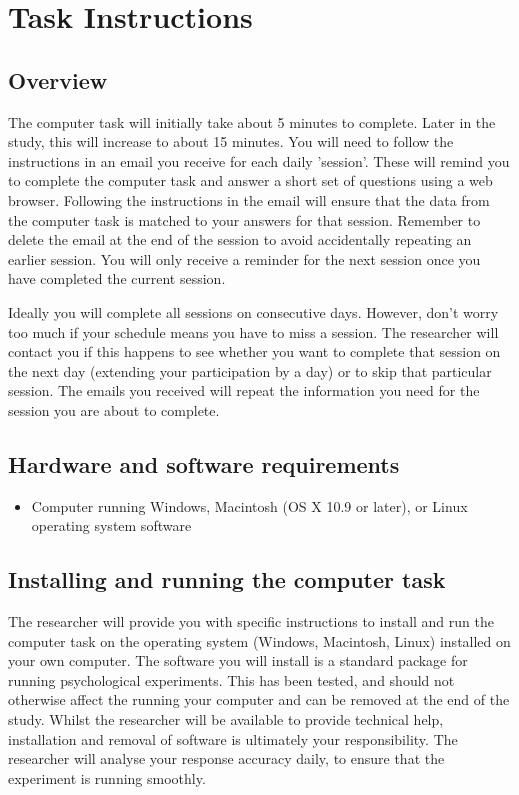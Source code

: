 \section{Task Instructions}

\subsection{Overview}

The computer task will initially take about 5 minutes to complete. Later
in the study, this will increase to about 15 minutes. You will need
to follow the instructions in an email you receive for each daily
'session'. These will remind you to complete the computer task and
answer a short set of questions using a web browser. Following the
instructions in the email will ensure that the data from the computer
task is matched to your answers for that session.  Remember to delete
the email at the end of the session to avoid accidentally repeating an
earlier session. You will only receive a reminder for the next session
once you have completed the current session.

Ideally you will complete all sessions on consecutive days. However, don't
worry too much if your schedule means you have to miss a session. The
researcher will contact you if this happens to see whether you want to
complete that session on the next day (extending your participation by
a day) or to skip that particular session. The emails you received will
repeat the information you need for the session you are about to complete.

\subsection{Hardware and software requirements}
\begin{itemize}
\item Computer running Windows, Macintosh (OS X 10.9 or later), or Linux operating system software
\end{itemize}

\subsection[Installing and running the computer task]{Installing and running the computer task}

The researcher will provide you with specific instructions to install
and run the computer task on the operating system (Windows, Macintosh,
Linux) installed on your own computer. The software you will install
is a standard package for running psychological experiments. This has
been tested, and should not otherwise affect the running your computer
and can be removed at the end of the study. Whilst the researcher will
be available to provide technical help, installation and removal of
software is ultimately your responsibility. The researcher will analyse
your response accuracy daily, to ensure that the experiment is running
smoothly.

